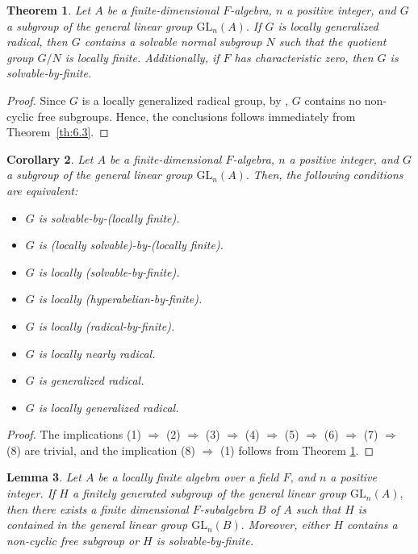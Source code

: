 \documentclass{amsart}
\newtheorem{theorem}{Theorem}[section]
\newtheorem{lemma}[theorem]{Lemma}
\newtheorem{corollary}[theorem]{Corollary}
\theoremstyle{definition}
\begin{document}
\begin{theorem}\label{th:6.5} Let $A$ be a finite-dimensional $F$-algebra, $n$ a positive integer, and $G$ a subgroup of the general linear group $\mathrm{GL}_n(A).$ If $G$ is locally generalized radical, then $G$ contains a solvable normal subgroup $N$ such that the quotient group $G/N$ is locally finite. Additionally, if $F$ has characteristic zero, then $G$ is solvable-by-finite.
\end{theorem}
\begin{proof}
Since $G$ is a locally generalized radical group, by \cite[Theorem 2.4]{Pa_ChuaHai_2026}, $G$ contains no non-cyclic free subgroups. Hence, the conclusions follows immediately from Theorem~\ref{th:6.3}.
\end{proof}
\begin{corollary}\label{cor:6.6} Let $A$ be a finite-dimensional $F$-algebra, $n$ a positive integer, and $G$ a subgroup of the general linear group $\mathrm{GL}_n(A).$ Then, the following conditions are equivalent:
	\begin{itemize}
		\rm\item [(1)]\textit{$G$ is solvable-by-(locally finite).}
		\item [(2)]\textit{$G$ is (locally solvable)-by-(locally finite).}
		\item [(3)]\textit{$G$ is locally (solvable-by-finite).}
		\item [(4)]\textit{$G$ is locally (hyperabelian-by-finite).}
		\item [(5)]\textit{$G$ is locally (radical-by-finite).}
		\item [(6)]\textit{$G$ is locally nearly radical.}
		\item [(7)]\textit{$G$ is generalized radical.}
		\item [(8)]\textit{$G$ is locally generalized radical.}
	\end{itemize}
\end{corollary}
\begin{proof}
	The implications (1) $\Rightarrow$ (2) $\Rightarrow$ (3) $\Rightarrow$ (4) $\Rightarrow$ (5) $\Rightarrow$ (6) $\Rightarrow$ (7) $\Rightarrow$ (8) are trivial, and the implication (8) $\Rightarrow$ (1) follows from Theorem \ref{th:6.5}.
\end{proof}
\begin{lemma}\label{lem:6.7} Let $A$ be a locally finite algebra over a field $F$, and $n$ a positive integer. If $H$ a finitely generated subgroup of the general linear group $\mathrm{GL}_n(A),$ then there exists a finite dimensional $F$-subalgebra $B$ of $A$ such that $H$ is contained in the general linear group $\mathrm{GL}_n(B).$ Moreover, either $H$ contains a non-cyclic free subgroup or $H$ is solvable-by-finite.
\end{lemma}
\end{document}
